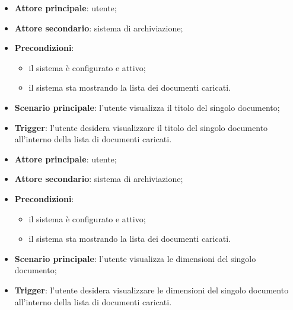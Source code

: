\documentclass[10pt, a4paper]{article}
\begin{document}
    \begin{itemize}
        \item \textbf{Attore principale}: utente;
        \item \textbf{Attore secondario}: sistema di archiviazione;
        \item \textbf{Precondizioni}:
            \begin{itemize}
                \item il sistema è configurato e attivo;
                \item il sistema sta mostrando la lista dei documenti caricati.
            \end{itemize}
        \item \textbf{Scenario principale}: l'utente visualizza il titolo del singolo documento;
        \item \textbf{Trigger}: l’utente desidera visualizzare il titolo del singolo documento all’interno della lista di documenti caricati.
    \end{itemize}

    \begin{itemize}
        \item \textbf{Attore principale}: utente;
        \item \textbf{Attore secondario}: sistema di archiviazione;
        \item \textbf{Precondizioni}:
            \begin{itemize}
                \item il sistema è configurato e attivo;
                \item il sistema sta mostrando la lista dei documenti caricati.
            \end{itemize}
        \item \textbf{Scenario principale}: l'utente visualizza le dimensioni del singolo documento;
        \item \textbf{Trigger}: l’utente desidera visualizzare le dimensioni del singolo documento all’interno della lista di documenti caricati.
    \end{itemize}
\end{document}
